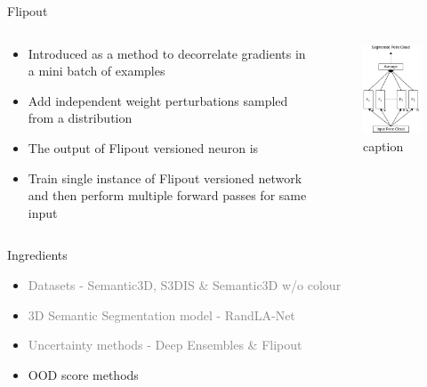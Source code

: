 \documentclass[aspectratio=169]{beamer}
\begin{document}
\begin{frame}{Flipout}
    \begin{columns}
        \begin{column}{0.5\textwidth}
            \begin{itemize}
                \item Introduced as a method to decorrelate gradients in a mini batch of examples
                \item Add independent weight perturbations sampled from a distribution
                \item The output of Flipout versioned neuron is 
                
                \item Train single instance of Flipout versioned network and then perform multiple forward passes for same input
            \end{itemize}
        \end{column}
        \begin{column}{0.5\textwidth}
            \begin{figure}
                \centering
                \includegraphics[scale=0.5]{images/flipout.jpg}
                \caption{caption}
                \label{fig:flipout_work}
            \end{figure}
        \end{column}
    \end{columns}
\end{frame}
\begin{frame}[noframenumbering]{Ingredients}
    \begin{itemize}
        \item \textcolor{gray}{Datasets - Semantic3D, S3DIS \& Semantic3D w/o colour}
        \item \textcolor{gray}{3D Semantic Segmentation model - RandLA-Net}
        \item \textcolor{gray}{Uncertainty methods - Deep Ensembles \& Flipout}
        \item OOD score methods
    \end{itemize}
\end{frame}
\end{document}
